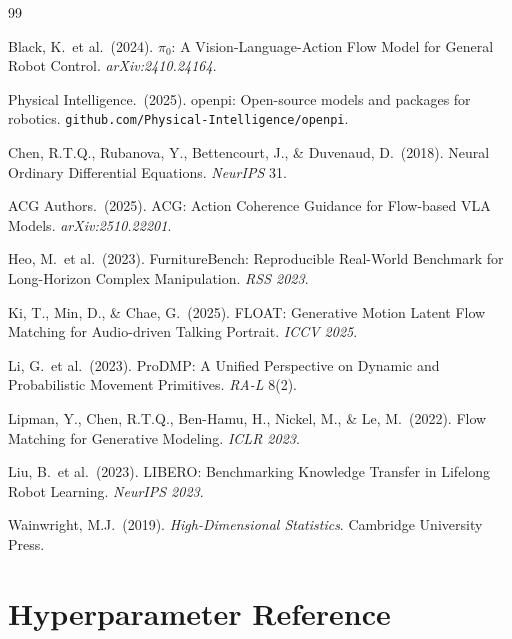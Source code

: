 \documentclass[11pt]{article}
\theoremstyle{plain}
\theoremstyle{definition}
\begin{document}
\begin{thebibliography}{99}

Black, K.\ et al.\ (2024).
$\pi_0$: A Vision-Language-Action Flow Model for General Robot Control.
\textit{arXiv:2410.24164}.

Physical Intelligence.\ (2025).
openpi: Open-source models and packages for robotics.
\texttt{github.com/Physical-Intelligence/openpi}.

Chen, R.T.Q., Rubanova, Y., Bettencourt, J., \& Duvenaud, D.\ (2018).
Neural Ordinary Differential Equations.
\textit{NeurIPS} 31.

ACG Authors.\ (2025).
ACG: Action Coherence Guidance for Flow-based VLA Models.
\textit{arXiv:2510.22201}.

Heo, M.\ et al.\ (2023).
FurnitureBench: Reproducible Real-World Benchmark for Long-Horizon Complex Manipulation.
\textit{RSS 2023}.

Ki, T., Min, D., \& Chae, G.\ (2025).
FLOAT: Generative Motion Latent Flow Matching for Audio-driven Talking Portrait.
\textit{ICCV 2025}.

Li, G.\ et al.\ (2023).
ProDMP: A Unified Perspective on Dynamic and Probabilistic Movement Primitives.
\textit{RA-L} 8(2).

Lipman, Y., Chen, R.T.Q., Ben-Hamu, H., Nickel, M., \& Le, M.\ (2022).
Flow Matching for Generative Modeling.
\textit{ICLR 2023}.

Liu, B.\ et al.\ (2023).
LIBERO: Benchmarking Knowledge Transfer in Lifelong Robot Learning.
\textit{NeurIPS 2023}.

Wainwright, M.J.\ (2019).
\textit{High-Dimensional Statistics}. Cambridge University Press.

\end{thebibliography}

\appendix
\renewcommand{\thesection}{\Alph{section}}
\setcounter{section}{0}

\section{Hyperparameter Reference}
\label{app:hyperparams}
\end{document}
